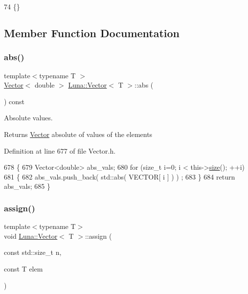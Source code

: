 \begin{DoxyCode}
74 \{\}
\end{DoxyCode}


\subsection{Member Function Documentation}
\mbox{\label{classLuna_1_1Vector_a1fe66d19f6641be9e301a306fdb58cbe}} 
\subsubsection{\texorpdfstring{abs()}{abs()}}
{\footnotesize\ttfamily template$<$typename T $>$ \\
\hyperlink{classLuna_1_1Vector}{Vector}$<$ double $>$ \hyperlink{classLuna_1_1Vector}{Luna\+::\+Vector}$<$ T $>$\+::abs (\begin{DoxyParamCaption}{ }\end{DoxyParamCaption}) const\hspace{0.3cm}{\ttfamily [inline]}}



Absolute values. 

\begin{DoxyReturn}{Returns}
\hyperlink{classLuna_1_1Vector}{Vector} absolute of values of the elements 
\end{DoxyReturn}


Definition at line 677 of file Vector.\+h.


\begin{DoxyCode}
678   \{
679     Vector<double> abs\_vals;
680     \textcolor{keywordflow}{for} (\textcolor{keywordtype}{size\_t} i=0; i < this->\hyperlink{classLuna_1_1Vector_ac9b6ed7a0df401728f27c193fbc8f4d8}{size}(); ++i)
681     \{
682       abs\_vals.push\_back( std::abs( VECTOR[ i ] ) ) ;
683     \}
684     \textcolor{keywordflow}{return} abs\_vals;
685   \}
\end{DoxyCode}
\mbox{\label{classLuna_1_1Vector_ac543e0e7e7add55358f976f0baabbae3}} 
\subsubsection{\texorpdfstring{assign()}{assign()}}
{\footnotesize\ttfamily template$<$typename T$>$ \\
void \hyperlink{classLuna_1_1Vector}{Luna\+::\+Vector}$<$ T $>$\+::assign (\begin{DoxyParamCaption}\item[{const std\+::size\+\_\+t}]{n,  }\item[{const T}]{elem }\end{DoxyParamCaption})\hspace{0.3cm}{\ttfamily [inline]}}



